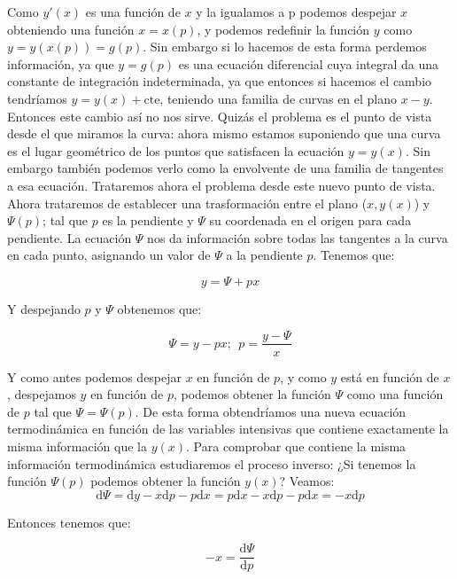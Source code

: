 \documentclass[12pt,a4paper]{article}
\newcommand{\D}{\mathrm{d}}
\newcommand{\cte}{\mathrm{cte}}
\begin{document}
Como $y'(x)$ es una función de $x$ y la igualamos a p podemos despejar $x$ obteniendo una función $x = x(p)$, y podemos redefinir la función $y$ como $y = y(x(p)) = g(p)$. Sin embargo si lo hacemos de esta forma perdemos información, ya que $y=g(p)$ es una ecuación diferencial cuya integral da una constante de integración indeterminada, ya que entonces si hacemos el cambio tendríamos $y = y(x) + \cte$, teniendo una familia de curvas en el plano $x-y$.  Entonces este cambio así no nos sirve. Quizás el problema es el punto de vista desde el que miramos la curva: ahora mismo estamos suponiendo que una curva es el lugar geométrico de los puntos que satisfacen la ecuación $y=y(x)$. Sin embargo también podemos verlo como la envolvente de una familia de tangentes a esa ecuación. Trataremos ahora el problema desde este nuevo punto de vista. \\

Ahora trataremos de establecer una trasformación entre el plano ($x, y(x)$) y $\Psi(p)$; tal que $p$ es la pendiente y $\Psi$ su coordenada en el origen para cada pendiente. La ecuación $\Psi$ nos da información sobre todas las tangentes a la curva en cada punto, asignando un valor de $\Psi$ a la pendiente $p$. Tenemos que:

\begin{equation}
y = \Psi + px 
\end{equation}  

Y despejando $p$ y $\Psi$ obtenemos que:

\begin{equation}
\Psi = y - px ; \ \ p = \dfrac{y - \Psi }{x}
\end{equation}

Y como antes podemos despejar $x$ en función de $p$, y como $y$ está en función de $x$, despejamos $y$ en función de $p$, podemos obtener la función $\Psi$ como una función de $p$ tal que $\Psi = \Psi(p)$. De esta forma obtendríamos una nueva ecuación termodinámica en función de las variables intensivas que contiene exactamente la misma información que la $y(x)$. Para comprobar que contiene la misma información termodinámica estudiaremos el proceso inverso: ¿Si tenemos la función $\Psi(p)$ podemos obtener la función $y(x)$? Veamos: \\

$$ \D \Psi = \D y - x \D p - p \D x = p \D x  -   x \D p - p \D x = - x \D p $$

Entonces tenemos que:

$$ - x = \dfrac{\D \Psi}{\D p} $$
\end{document}
